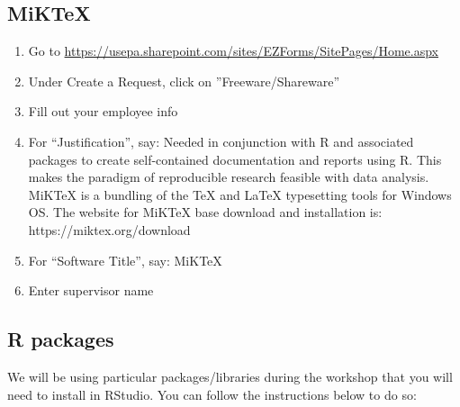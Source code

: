 \documentclass{article}
\begin{document}
\subsection{MiKTeX}
\begin{enumerate}
    \item Go to \url{https://usepa.sharepoint.com/sites/EZForms/SitePages/Home.aspx}
    \item Under Create a Request, click on ''Freeware/Shareware''
    \item Fill out your employee info
    \item For ``Justification'', say: Needed in conjunction with R and
      associated packages to create self-contained documentation and
      reports using R. This makes the paradigm of reproducible
      research feasible with data analysis. MiKTeX is a bundling of
      the TeX and LaTeX typesetting tools for Windows OS. The website
      for MiKTeX base download and installation is:
      https://miktex.org/download
    \item For ``Software Title'', say: MiKTeX
    \item Enter supervisor name
\end{enumerate}

%
%


\subsection{R packages}
We will be using particular packages/libraries during the workshop that you will need to install in RStudio. You can follow the instructions below to do so:
\end{document}

